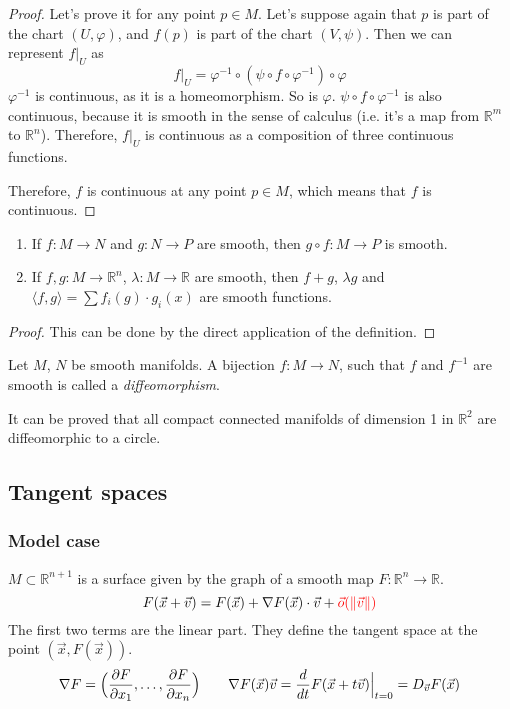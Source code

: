 \begin{proof}
    Let's prove it for any point $p \in M$.
    Let's suppose again that $p$ is part of the chart $(U, \varphi)$,
    and $f(p)$ is part of the chart $(V, \psi)$.
    Then we can represent $f|_U$ as
    \[
        f|_U = \varphi^{-1} \circ (\psi \circ f \circ \varphi^{-1}) \circ \varphi
    \]
    $\varphi^{-1}$ is continuous, as it is a homeomorphism. So is $\varphi$.
    $\psi \circ f \circ \varphi^{-1}$ is also continuous, because it is
    smooth in the sense of calculus (i.e. it's a map from $\mathbb{R}^m$ to $\mathbb{R}^n$).
    Therefore, $f|_U$ is continuous as a composition of three continuous functions.

    Therefore, $f$ is continuous at any point $p \in M$, which means that
    $f$ is continuous.
\end{proof}
\begin{proposition}
    \label{prop:propTwoIdk}
    \begin{enumerate}
        \item {
            If $f : M \to N$ and $g : N \to P$ are smooth, then 
            $g \circ f : M \to P$ is smooth.
        }
        \item {
            If $f, g : M \to \mathbb{R}^n$, $\lambda : M \to \mathbb{R}$
            are smooth, then $f + g$, $\lambda g$ and
            $\langle f, g \rangle = \sum f_i(g) \cdot g_i(x)$ are
            smooth functions.
        }
    \end{enumerate}
\end{proposition}
\begin{proof}
    This can be done by the direct application of the definition.
\end{proof}
\begin{definition}[Diffeomorphism]
    Let $M$, $N$  be smooth manifolds. A bijection $f : M \to N$,
    such that $f$ and $f^{-1}$ are smooth is called a 
    \textit{diffeomorphism}.
\end{definition}
\begin{example}
    It can be proved that all compact connected manifolds of dimension 1
    in $\mathbb{R}^2$ are diffeomorphic to a circle.
\end{example}

\subsection{Tangent spaces}
\subsubsection*{Model case}
$M \subset \mathbb{R}^{n+1}$ is a surface given by the graph
of a smooth map $F : \mathbb{R}^n \to \mathbb{R}$.
\[ 
    F(\vec{x} + \vec{v}) = F(\vec{x}) + \nabla F(\vec{x}) \cdot \vec{v} + 
    \textcolor{red}{\vec{o}(\lVert\vec{v}\rVert)}
\]
The first two terms are the linear part. They define the tangent space at the point $(\vec{x}, F(\vec{x}))$.
\[
    \nabla F =\Bigl( \frac{\partial F}{\partial x_1}, \dots, 
    \frac{\partial F}{\partial x_n} \Bigr)
    \qquad
    \nabla F(\vec{x}) \vec{v} = \frac{d}{dt} F(\vec{x} + t\vec{v})\Big|_{t=0} =
    D_{\vec{v}} F(\vec{x})
\]
